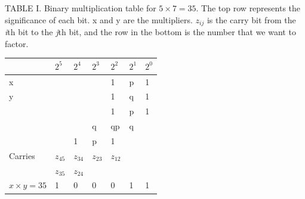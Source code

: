 \documentclass[%
 reprint,
 amsmath,amssymb,
 aps,
]{revtex4-1}
\begin{document}
\begin{flushleft}
TABLE I. Binary multiplication table for $ 5 \times 7 = 35 $. The top row represents the significance of each bit. x and y are the multipliers. $z_{ij}$ is the carry bit from the \textit{i}th bit to the \textit{j}th bit, and the row in the bottom is the number that we want to factor\cite{Xu2017}.
\begin{tabular}{ p{1.7cm}  p{1cm} p{1cm} p{1cm} p{1cm} p{1cm} p{1cm}} \hline\hline
 & \textit{$2^5$}  & \textit{$2^4$}  & \textit{$2^3$}
& \textit{$2^2$}   & \textit{$2^1$} & \textit{$2^0$} \\ \hline

x &\hspace{0.1cm} &\hspace{0.1cm} &\hspace{0.1cm} &1 &p &1 \\ 

y &\hspace{0.1cm} &\hspace{0.1cm} &\hspace{0.1cm} &1 &q &1 \\ 

\hspace{0.1cm} &\hspace{0.1cm} &\hspace{0.1cm} &\hspace{0.1cm} &1 &p &1 \\ 

\hspace{0.1cm} &\hspace{0.1cm} &\hspace{0.1cm} &q  &qp &q &\hspace{0.1cm} \\ 

\hspace{0.1cm} &\hspace{0.1cm} &1 &p  &1 &\hspace{0.1cm} &\hspace{0.1cm} \\ 

Carries &$z_{45}$ &$z_{34}$ &$z_{23}$ &$z_{12}$ &\hspace{0.1cm} &\hspace{0.1cm} \\ 

\hspace{0.1cm} &$z_{35}$ &$z_{24}$ &\hspace{0.1cm}  &\hspace{0.1cm} &\hspace{0.1cm} &\hspace{0.1cm} \\ 

$x \times y = 35$ &1 &0 &0 &0 &1 &1 \\ 
\hline
\end{tabular}
\\
\end{flushleft}
\end{document}
